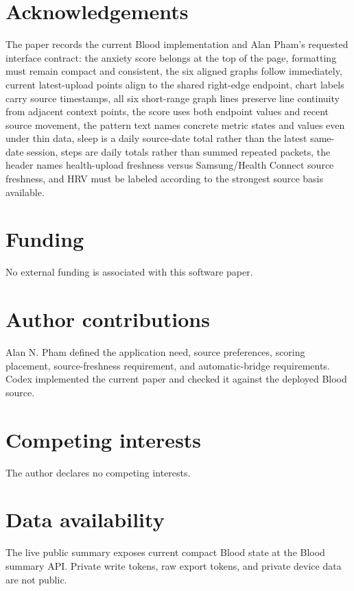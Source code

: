 \documentclass[12pt,letterpaper]{article}
\begin{document}
\section{Acknowledgements}

The paper records the current Blood implementation and Alan Pham's requested interface contract: the anxiety score belongs at the top of the page, formatting must remain compact and consistent, the six aligned graphs follow immediately, current latest-upload points align to the shared right-edge endpoint, chart labels carry source timestamps, all six short-range graph lines preserve line continuity from adjacent context points, the score uses both endpoint values and recent source movement, the pattern text names concrete metric states and values even under thin data, sleep is a daily source-date total rather than the latest same-date session, steps are daily totals rather than summed repeated packets, the header names health-upload freshness versus Samsung/Health Connect source freshness, and HRV must be labeled according to the strongest source basis available.

\section{Funding}

No external funding is associated with this software paper.

\section{Author contributions}

Alan N. Pham defined the application need, source preferences, scoring placement, source-freshness requirement, and automatic-bridge requirements. Codex implemented the current paper and checked it against the deployed Blood source.

\section{Competing interests}

The author declares no competing interests.

\section{Data availability}

The live public summary exposes current compact Blood state at the Blood summary API. Private write tokens, raw export tokens, and private device data are not public.
\end{document}

